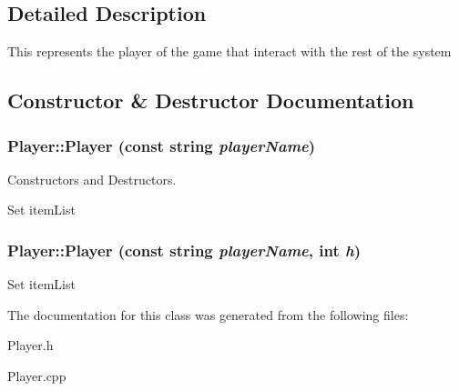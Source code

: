 \subsection{Detailed Description}
This represents the player of the game that interact with the rest of the system 

\subsection{Constructor \& Destructor Documentation}
\hypertarget{classPlayer_a8d83d0f0e6ff61b2003b9769c8be3f88}{
\subsubsection[{Player}]{\setlength{\rightskip}{0pt plus 5cm}Player::Player (const string {\em playerName})}}
\label{classPlayer_a8d83d0f0e6ff61b2003b9769c8be3f88}


Constructors and Destructors. 

Set itemList \hypertarget{classPlayer_a25291eed6de2d4ffe9f72422c79af64c}{
\subsubsection[{Player}]{\setlength{\rightskip}{0pt plus 5cm}Player::Player (const string {\em playerName}, \/  int {\em h})}}
\label{classPlayer_a25291eed6de2d4ffe9f72422c79af64c}


Set itemList 

The documentation for this class was generated from the following files:\begin{DoxyCompactItemize}
\item 
Player.h\item 
Player.cpp\end{DoxyCompactItemize}
